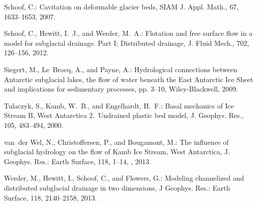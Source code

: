 \documentclass[11pt,reqno]{amsart}
\begin{document}
\begin{thebibliography}{}
Schoof, C.: Cavitation on deformable glacier beds, SIAM J. Appl. Math., 67,
  1633--1653, 2007.

Schoof, C., Hewitt, I.~J., and Werder, M.~A.: Flotation and free surface flow
  in a model for subglacial drainage. {P}art {I}: {D}istributed drainage, J.
  Fluid Mech., 702, 126--156, 2012.

Siegert, M., Le~Brocq, A., and Payne, A.: Hydrological connections between
  Antarctic subglacial lakes, the flow of water beneath the East Antarctic Ice
  Sheet and implications for sedimentary processes, pp. 3--10, Wiley-Blackwell,
  2009.

Tulaczyk, S., Kamb, W.~B., and Engelhardt, H.~F.: Basal mechanics of {I}ce
  {S}tream {B}, {W}est {A}ntarctica 2.~{U}ndrained plastic bed model, J.
  Geophys. Res., 105, 483--494, 2000{}.

van~der Wel, N., Christoffersen, P., and Bougamont, M.: The influence of
  subglacial hydrology on the flow of {K}amb {I}ce {S}tream, {W}est
  {A}ntarctica, J. Geophys. Res.: Earth Surface, 118, 1--14,
  , 2013.

Werder, M., Hewitt, I., Schoof, C., and Flowers, G.: Modeling channelized and
  distributed subglacial drainage in two dimensions, J Geophys. Res.: Earth
  Surface, 118, 2140--2158, 2013.
\end{thebibliography}
\end{document}
